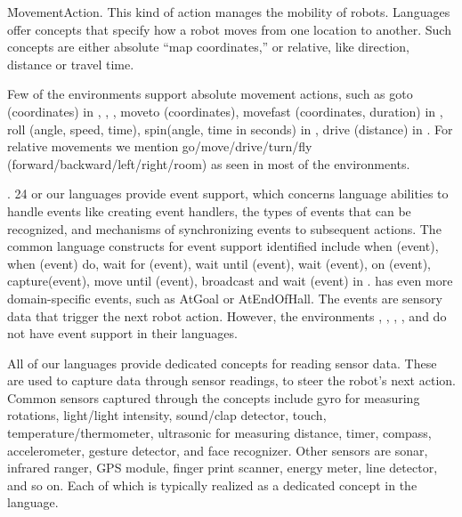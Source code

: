 \f{MovementAction}. This kind of action manages the mobility of robots. Languages offer concepts that specify how a robot moves from one location to another. Such  concepts are either absolute ``map coordinates,'' or relative, like direction, distance or travel time.

Few of the environments support absolute movement actions, such as goto (coordinates) in \flyaq, \missionlab, \makeblock, moveto (coordinates), movefast (coordinates, duration) in \tivipe, roll (angle, speed, time), spin(angle, time in seconds) in \sphero, drive (distance) in \codelab. For relative movements we mention go/move/drive/turn/fly (forward/backward/left/right/room) as seen in most of the environments. %






 




\parhead{\fevents}. 24 or our languages provide event support, which concerns language abilities to handle events like creating event handlers, the types of events that can be recognized, and mechanisms of synchronizing events to subsequent actions. The common language constructs for event support identified include when (event), when (event) do, wait for (event), wait until (event), wait (event), on (event), capture(event), move until (event), broadcast and wait (event) in \vex. \missionlab has even more domain-specific events, such as AtGoal or AtEndOfHall. 
The events are sensory data that trigger the next robot action. However, the environments \arcbotics, \tivipe, \minibloq, \turtlebot, and \robotc do not have event support in their languages.

 All of our languages provide dedicated concepts for reading sensor data. These are used to capture data through sensor readings, to steer the robot's next action. 
Common sensors captured through the concepts  include gyro for measuring rotations, light/light intensity, sound/clap detector, touch, temperature/thermometer, ultrasonic for measuring distance, timer, compass, accelerometer, gesture detector, and face recognizer. Other sensors are sonar, infrared ranger, GPS module, finger print scanner, energy meter, line detector, and so on. Each of which is typically realized as a dedicated concept in the language.


